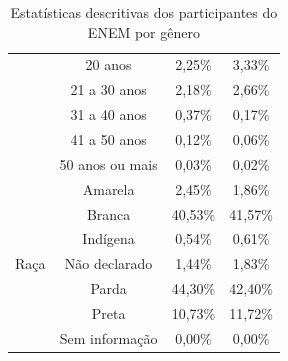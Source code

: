 \begin{table}[h]
\begin{tabular}{cccc}
    & 20 anos              & 2,25\%            & 3,33\%             \\ \cline{2-4} 
    & 21 a 30 anos              & 2,18\%            & 2,66\%             \\ \cline{2-4} 
    & 31 a 40 anos              & 0,37\%            & 0,17\%             \\ \cline{2-4}
    & 41 a 50 anos              & 0,12\%            & 0,06\%             \\ \cline{2-4} 
    & 50 anos ou mais           & 0,03\%            & 0,02\%             \\ \hline
    \multirow{7}{*}{Raça}                       & Amarela                   & 2,45\%            & 1,86\%             \\ \cline{2-4} 
                                                & Branca                    & 40,53\%           & 41,57\%            \\ \cline{2-4} 
                                                & Indígena                  & 0,54\%            & 0,61\%             \\ \cline{2-4} 
                                                & Não declarado             & 1,44\%            & 1,83\%             \\ \cline{2-4} 
                                                & Parda                     & 44,30\%           & 42,40\%            \\ \cline{2-4} 
                                                & Preta                     & 10,73\%           & 11,72\%            \\ \cline{2-4} 
                                                & Sem informação            & 0,00\%            & 0,00\%             \\ \hline
    \end{tabular}
    \caption{Estatísticas descritivas dos participantes do ENEM por gênero}
    \label{tab:estatistica-enem}
    \end{table}

